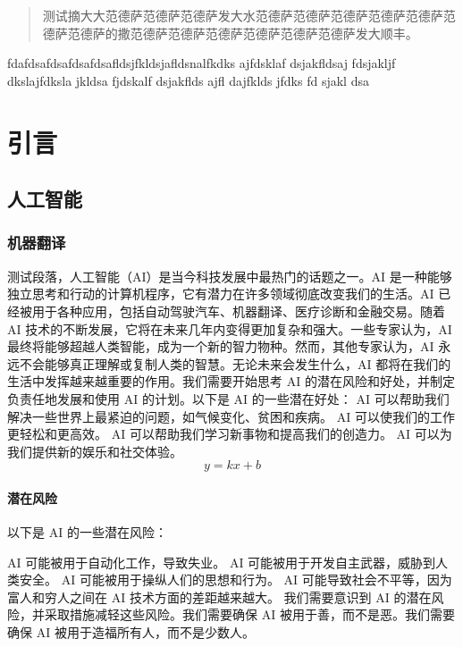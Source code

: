 \documentclass[engineeringmaster]{hquThesis}
\begin{document}
\makecover
\frontmatter
\begin{abstract}
    测试摘大大范德萨范德萨范德萨发大水范德萨范德萨范德萨范德萨范德萨范德萨范德萨的撒范德萨范德萨范德萨范德萨范德萨范德萨发大顺丰。\par
\end{abstract}
\begin{abstractEn}
    fdafdsafdsafdsafdsafldsjfkldsjafldsnalfkdks ajfdsklaf dsjakfldsaj fdsjakljf dkslajfdksla jkldsa fjdskalf dsjakflds ajfl dajfklds jfdks fd sjakl dsa\par
\end{abstractEn}
\tableofcontents
\mainmatter
\chapter{引言}
\section{人工智能}
\subsection{机器翻译}
测试段落，人工智能（AI）是当今科技发展中最热门的话题之一。AI 是一种能够独立思考和行动的计算机程序，它有潜力在许多领域彻底改变我们的生活。AI 已经被用于各种应用，包括自动驾驶汽车、机器翻译、医疗诊断和金融交易。随着 AI 技术的不断发展，它将在未来几年内变得更加复杂和强大。一些专家认为，AI 最终将能够超越人类智能，成为一个新的智力物种。然而，其他专家认为，AI 永远不会能够真正理解或复制人类的智慧。无论未来会发生什么，AI 都将在我们的生活中发挥越来越重要的作用。我们需要开始思考 AI 的潜在风险和好处，并制定负责任地发展和使用 AI 的计划。以下是 AI 的一些潜在好处：
AI 可以帮助我们解决一些世界上最紧迫的问题，如气候变化、贫困和疾病。
AI 可以使我们的工作更轻松和更高效。
AI 可以帮助我们学习新事物和提高我们的创造力。
AI 可以为我们提供新的娱乐和社交体验。
\begin{equation}
y = kx + b
\end{equation}

\subsubsection{潜在风险}
以下是 AI 的一些潜在风险：

AI 可能被用于自动化工作，导致失业。
AI 可能被用于开发自主武器，威胁到人类安全。
AI 可能被用于操纵人们的思想和行为。
AI 可能导致社会不平等，因为富人和穷人之间在 AI 技术方面的差距越来越大。
我们需要意识到 AI 的潜在风险，并采取措施减轻这些风险。我们需要确保 AI 被用于善，而不是恶。我们需要确保 AI 被用于造福所有人，而不是少数人。
\end{document}

